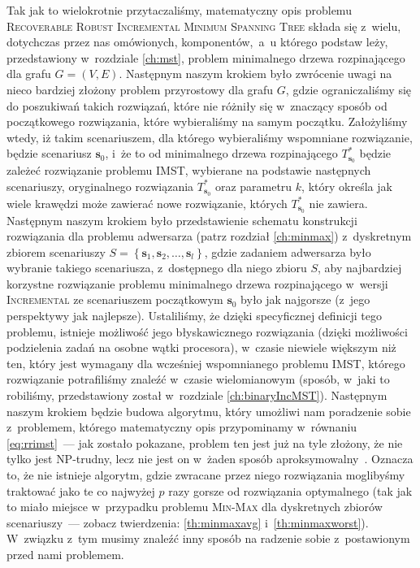 Tak jak to wielokrotnie przytaczaliśmy, matematyczny opis problemu \textsc{Recoverable Robust Incremental Minimum Spanning Tree} składa się z~wielu, dotychczas przez nas omówionych, komponentów,~a~u którego podstaw leży, przedstawiony w~rozdziale \ref{ch:mst}, problem minimalnego drzewa rozpinającego dla grafu $G = \left( V, E \right)$.
Następnym naszym krokiem było zwrócenie uwagi na nieco bardziej złożony problem przyrostowy dla grafu $G$, gdzie ograniczaliśmy się do poszukiwań takich rozwiązań, które nie różniły się w~znaczący sposób od początkowego rozwiązania, które wybieraliśmy na samym początku. 
Założyliśmy wtedy, iż takim scenariuszem, dla którego wybieraliśmy wspomniane rozwiązanie, będzie scenariusz $\textbf{s}_{0}$, i~że to od minimalnego drzewa rozpinającego $T^{\ast}_{\textbf{s}_{0}}$ będzie zależeć rozwiązanie problemu \textsc{IMST}, wybierane na podstawie następnych scenariuszy, oryginalnego rozwiązania $T^{\ast}_{\textbf{s}_{0}}$ oraz parametru $k$, który określa jak wiele krawędzi może zawierać nowe rozwiązanie, których $T^{\ast}_{\textbf{s}_{0}}$ nie zawiera.
Następnym naszym krokiem było przedstawienie schematu konstrukcji rozwiązania dla problemu adwersarza (patrz rozdział \ref{ch:minmax}) z~dyskretnym zbiorem scenariuszy $S = \left\{ \textbf{s}_{1}, \textbf{s}_{2}, \dots, \textbf{s}_{l} \right\}$, gdzie zadaniem adwersarza było wybranie takiego scenariusza, z~dostępnego dla niego zbioru $S$, aby najbardziej korzystne rozwiązanie problemu minimalnego drzewa rozpinającego w~wersji \textsc{Incremental} ze scenariuszem początkowym $\textbf{s}_{0}$ było jak najgorsze (z~jego perspektywy jak najlepsze).
Ustaliliśmy, że dzięki specyficznej definicji tego problemu, istnieje możliwość jego błyskawicznego rozwiązania (dzięki możliwości podzielenia zadań na osobne wątki procesora), w~czasie niewiele większym niż ten, który jest wymagany dla wcześniej wspomnianego problemu \textsc{IMST}, którego rozwiązanie potrafiliśmy znaleźć w~czasie wielomianowym (sposób, w~jaki to robiliśmy, przedstawiony został w~rozdziale \ref{ch:binaryIncMST}).
Następnym naszym krokiem będzie budowa algorytmu, który umożliwi nam poradzenie sobie z~problemem, którego matematyczny opis przypominamy w~równaniu \ref{eq:rrimst}~--- jak zostało pokazane, problem ten jest już na tyle złożony, że nie tylko jest \textsc{NP}-trudny, lecz nie jest on w~żaden sposób aproksymowalny~\cite[twierdzenie $6$]{Kasperski2014}.
Oznacza to, że nie istnieje algorytm, gdzie zwracane przez niego rozwiązania moglibyśmy traktować jako te co najwyżej $p$ razy gorsze od rozwiązania optymalnego (tak jak to miało miejsce w~przypadku problemu \textsc{Min-Max} dla dyskretnych zbiorów scenariuszy~--- zobacz twierdzenia: \ref{th:minmaxavg} i~\ref{th:minmaxworst}).
W~związku z~tym musimy znaleźć inny sposób na radzenie sobie z~postawionym przed nami problemem.




